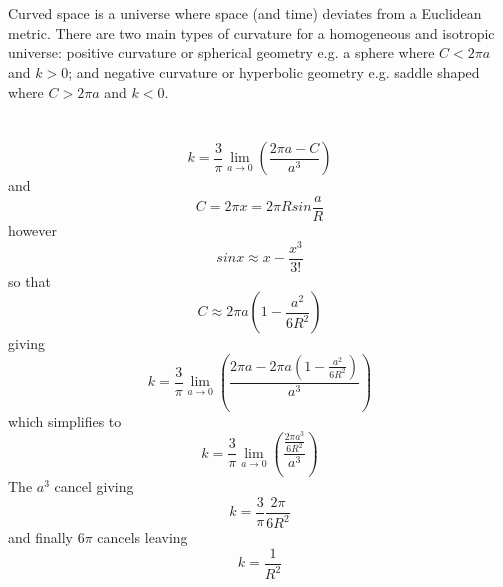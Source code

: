 \documentclass[a4paper,12pt]{article}
\begin{document}
\section{}
Curved space is a universe where space (and time) deviates from a Euclidean metric. There are two main types of curvature for
a homogeneous and isotropic universe: positive curvature or spherical geometry e.g. a sphere where $C<2\pi a$ and $k>0$;
and negative curvature or hyperbolic geometry e.g. saddle shaped where $C>2\pi a$ and $k<0$.

\section{}
\begin{equation}
k=\frac{3}{\pi}\lim_{a\to 0}\left(\frac{2\pi a - C}{a^3}\right)
\end{equation}
and
\begin{equation}
C=2\pi x = 2\pi R sin\frac{a}{R}
\end{equation}
however
\begin{equation}
sin x \approx x-\frac{x^3}{3!}
\end{equation}
so that
\begin{equation}
C\approx 2\pi a\left(1-\frac{a^2}{6R^2}\right)
\end{equation}
giving
\begin{equation}
k=\frac{3}{\pi}\lim_{a\to 0}\left(\frac{2\pi a - 2\pi a\left(1-\frac{a^2}{6R^2}\right)}{a^3}\right)
\end{equation}
which simplifies to
\begin{equation}
k=\frac{3}{\pi}\lim_{a\to 0}\left(\frac{\frac{2\pi a^3}{6R^2}}{a^3}\right)
\end{equation}
The $a^3$ cancel giving
\begin{equation}
k=\frac{3}{\pi}\frac{2\pi}{6R^2}
\end{equation}
and finally $6\pi$ cancels leaving
\begin{equation}
k=\frac{1}{R^2}
\end{equation}
\end{document}
